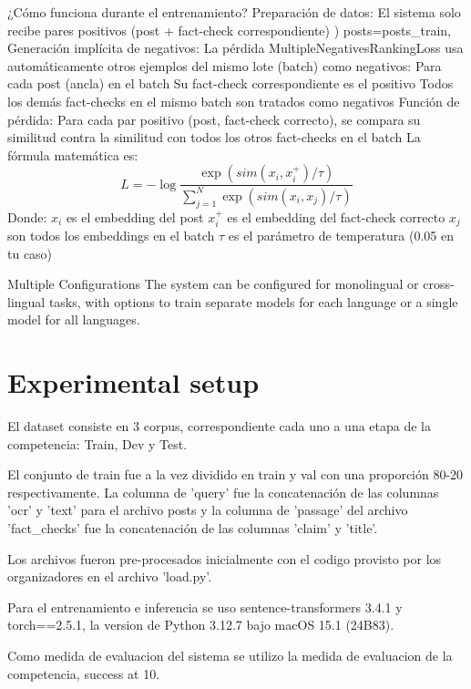 \documentclass[11pt]{article}
\begin{document}
¿Cómo funciona durante el entrenamiento?
Preparación de datos: El sistema solo recibe pares positivos (post + fact-check correspondiente)
)
       posts=posts_train,
Generación implícita de negativos: La pérdida MultipleNegativesRankingLoss usa automáticamente otros ejemplos del mismo lote (batch) como negativos:
Para cada post (ancla) en el batch
Su fact-check correspondiente es el positivo
Todos los demás fact-checks en el mismo batch son tratados como negativos
Función de pérdida: Para cada par positivo (post, fact-check correcto), se compara su similitud contra la similitud con todos los otros fact-checks en el batch
La fórmula matemática es:
$$L = -\log \frac{\exp(sim(x_i, x_i^+)/\tau)}{\sum_{j=1}^{N} \exp(sim(x_i, x_j)/\tau)}$$
Donde:
$x_i$ es el embedding del post
$x_i^+$ es el embedding del fact-check correcto
$x_j$ son todos los embeddings en el batch
$\tau$ es el parámetro de temperatura (0.05 en tu caso)

Multiple Configurations
The system can be configured for monolingual or cross-lingual tasks, with options to train separate models for each language or a single model for all languages.

\section{Experimental setup}

El dataset consiste en 3 corpus, correspondiente cada uno a una etapa de la competencia: Train, Dev y Test. 

El conjunto de train fue a la vez dividido en train y val con una proporción 80-20 respectivamente. La columna de 'query' fue la concatenación de las columnas 'ocr' y 'text' para el archivo posts y la columna de 'passage' del archivo 'fact\_checks' fue la concatenación de las columnas 'claim' y 'title'.

Los archivos fueron pre-procesados inicialmente con el codigo provisto por los organizadores en el archivo 'load.py'.  

Para el entrenamiento e inferencia se uso sentence-transformers 3.4.1 y torch==2.5.1, la version de Python 3.12.7 bajo macOS 15.1 (24B83). 

Como medida de evaluacion del sistema se utilizo la medida de evaluacion de la competencia, success at 10. 
\end{document}
